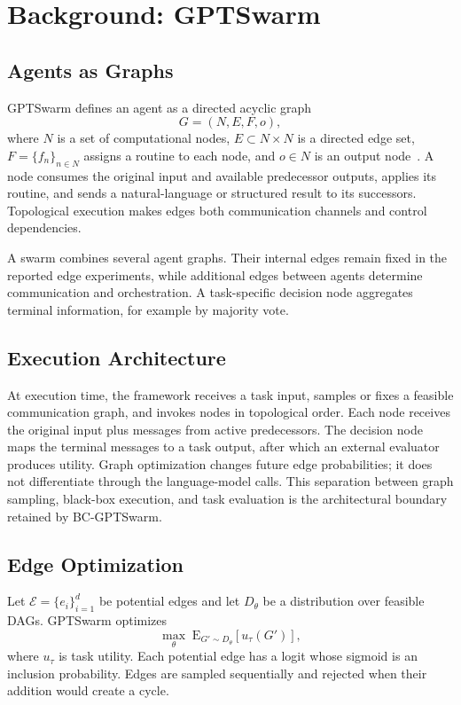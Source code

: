 \section{Background: GPTSwarm}

\subsection{Agents as Graphs}

GPTSwarm defines an agent as a directed acyclic graph
\begin{equation}
    G=(N,E,F,o),
\end{equation}
where $N$ is a set of computational nodes, $E\subset N\times N$ is a directed edge set, $F=\{f_n\}_{n\in N}$ assigns a routine to each node, and $o\in N$ is an output node~\cite{pmlr-v235-zhuge24a}. A node consumes the original input and available predecessor outputs, applies its routine, and sends a natural-language or structured result to its successors. Topological execution makes edges both communication channels and control dependencies.

A swarm combines several agent graphs. Their internal edges remain fixed in the reported edge experiments, while additional edges between agents determine communication and orchestration. A task-specific decision node aggregates terminal information, for example by majority vote.

\subsection{Execution Architecture}

At execution time, the framework receives a task input, samples or fixes a feasible communication graph, and invokes nodes in topological order. Each node receives the original input plus messages from active predecessors. The decision node maps the terminal messages to a task output, after which an external evaluator produces utility. Graph optimization changes future edge probabilities; it does not differentiate through the language-model calls. This separation between graph sampling, black-box execution, and task evaluation is the architectural boundary retained by BC-GPTSwarm.

\subsection{Edge Optimization}

Let $\mathcal{E}=\{e_i\}_{i=1}^{d}$ be potential edges and let $D_{\theta}$ be a distribution over feasible DAGs. GPTSwarm optimizes
\begin{equation}
    \max_{\theta}\;\mathrm{E}_{G'\sim D_{\theta}}[u_{\tau}(G')],
\end{equation}
where $u_{\tau}$ is task utility. Each potential edge has a logit whose sigmoid is an inclusion probability. Edges are sampled sequentially and rejected when their addition would create a cycle.

